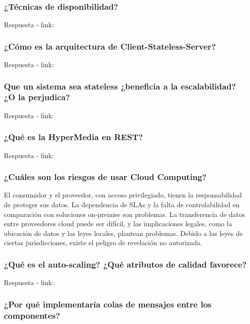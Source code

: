 \documentclass{article}
\begin{document}
  \subsubsection{¿Técnicas de disponibilidad?}
    Respuesta - link: \textbf{~}

  \subsubsection{¿Cómo es la arquitectura de Client-Stateless-Server?}
    Respuesta - link: \textbf{~}

  \subsubsection{Que un sistema sea stateless ¿beneficia a la escalabilidad? ¿O la perjudica? }
    Respuesta - link: \textbf{~}

  \subsubsection{¿Qué es la HyperMedia en REST?}
    Respuesta - link: \textbf{~}
    
  \subsubsection{¿Cuáles son los riesgos de usar Cloud Computing?}
  El consumidor y el proveedor, con acceso privilegiado, tienen la responsabilidad de proteger sus datos. La dependencia de SLAs y la falta de controlabilidad en comparación con soluciones on-premise son problemas. La transferencia de datos entre proveedores cloud puede ser difícil, y las implicaciones legales, como la ubicación de datos y las leyes locales, plantean problemas. Debido a las leyes de ciertas jurisdicciones, existe el peligro de revelación no autorizada.

  \subsubsection{¿Qué es el auto-scaling? ¿Qué atributos de calidad favorece?}
    Respuesta - link: \textbf{~}

  \subsubsection{¿Por qué implementaría colas de mensajes entre los componentes?}
  
\end{document}
